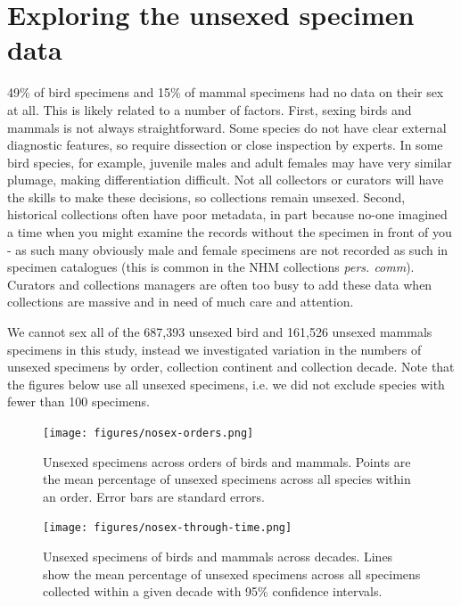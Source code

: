 \documentclass[a4paper, 12pt]{article}
\begin{document}
\newpage
\section{Exploring the unsexed specimen data}

49\% of bird specimens and 15\% of mammal specimens had no data on their sex at all. This is likely related to a number of factors. 
First, sexing birds and mammals is not always straightforward. Some species do not have clear external diagnostic features, so require dissection or close inspection by experts. 
In some bird species, for example, juvenile males and adult females may have very similar plumage, making differentiation difficult. 
Not all collectors or curators will have the skills to make these decisions, so collections remain unsexed. 
Second, historical collections often have poor metadata, in part because no-one imagined a time when you might examine the records without the specimen in front of you - as such many obviously male and female specimens are not recorded as such in specimen catalogues (this is common in the NHM collections \textit{pers. comm}).
 Curators and collections managers are often too busy to add these data when collections are massive and in need of much care and attention. 

We cannot sex all of the 687,393 unsexed bird and 161,526 unsexed mammals specimens in this study, instead we investigated variation in the numbers of unsexed specimens by order, collection continent and collection decade. 
Note that the figures below use all unsexed specimens, i.e. we did not exclude species with fewer than 100 specimens.

\begin{figure}[H]
 \centering
  \texttt{[image: figures/nosex-orders.png]}
  \caption{Unsexed specimens across orders of birds and mammals. 
  Points are the mean percentage of unsexed specimens across all species within an order. 
  Error bars are standard errors.}
  \label{fig-nosex-orders}
\end{figure}

\begin{figure}[H]
 \centering
  \texttt{[image: figures/nosex-through-time.png]}
  \caption{Unsexed specimens of birds and mammals across decades. 
  Lines show the mean percentage of unsexed specimens across all specimens collected within a given decade with 95\% confidence intervals.}
  \label{fig-nosex-decade}
\end{figure}
\end{document}
